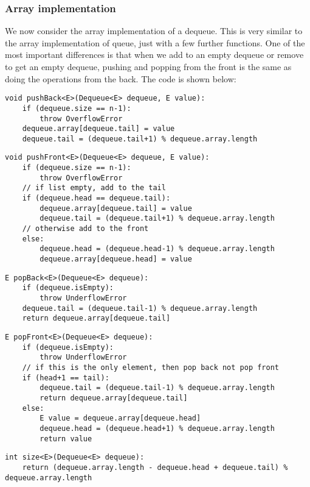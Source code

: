 \documentclass[a4paper, openany]{memoir}
\begin{document}
\subsubsection{Array implementation}
We now consider the array implementation of a dequeue. This is very similar to the array implementation of queue, just with a few further functions. One of the most important differences is that when we add to an empty dequeue or remove to get an empty dequeue, pushing and popping from the front is the same as doing the operations from the back. The code is shown below:
\begin{lstlisting}[language=pseudocode]
void pushBack<E>(Dequeue<E> dequeue, E value):
    if (dequeue.size == n-1):
        throw OverflowError
    dequeue.array[dequeue.tail] = value
    dequeue.tail = (dequeue.tail+1) % dequeue.array.length
\end{lstlisting}
\begin{lstlisting}[language=pseudocode]
void pushFront<E>(Dequeue<E> dequeue, E value):
    if (dequeue.size == n-1):
        throw OverflowError
    // if list empty, add to the tail
    if (dequeue.head == dequeue.tail):
        dequeue.array[dequeue.tail] = value
        dequeue.tail = (dequeue.tail+1) % dequeue.array.length
    // otherwise add to the front
    else:
        dequeue.head = (dequeue.head-1) % dequeue.array.length
        dequeue.array[dequeue.head] = value
\end{lstlisting}
\begin{lstlisting}[language=pseudocode]
E popBack<E>(Dequeue<E> dequeue):
    if (dequeue.isEmpty):
        throw UnderflowError
    dequeue.tail = (dequeue.tail-1) % dequeue.array.length
    return dequeue.array[dequeue.tail]
\end{lstlisting}
\begin{lstlisting}[language=pseudocode]
E popFront<E>(Dequeue<E> dequeue):
    if (dequeue.isEmpty):
        throw UnderflowError
    // if this is the only element, then pop back not pop front
    if (head+1 == tail):
        dequeue.tail = (dequeue.tail-1) % dequeue.array.length
        return dequeue.array[dequeue.tail]
    else:
        E value = dequeue.array[dequeue.head]
        dequeue.head = (dequeue.head+1) % dequeue.array.length
        return value
\end{lstlisting}
\begin{lstlisting}[language=pseudocode]
int size<E>(Dequeue<E> dequeue):
    return (dequeue.array.length - dequeue.head + dequeue.tail) % dequeue.array.length
\end{lstlisting}
\end{document}

